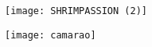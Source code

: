 
\thispagestyle{empty}
\clearpage
\setcounter{page}{-1}

\makeatletter
\begin{titlepage}
{
    \centering
    \null%
    \vfill
    \vspace{3em}
    \texttt{[image: SHRIMPASSION (2)]}
    \vspace{2em}
    \vfill
\begin{center}
    \texttt{[image: camarao]}
\end{center}
    \vspace{5em}

    \vfill
}
\end{titlepage}
\makeatother
